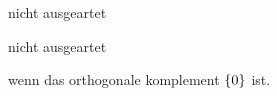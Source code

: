 \documentclass[class=article, crop=false]{standalone}
\begin{document}
\begin{zettel}{nicht ausgeartet}
\begin{flashcard}[9vprhh3z]{nicht ausgeartet}
	\begin{definition}
		wenn das orthogonale komplement $\set{0}$ ist.
	\end{definition}
\end{flashcard}
\end{zettel}
\end{document}

